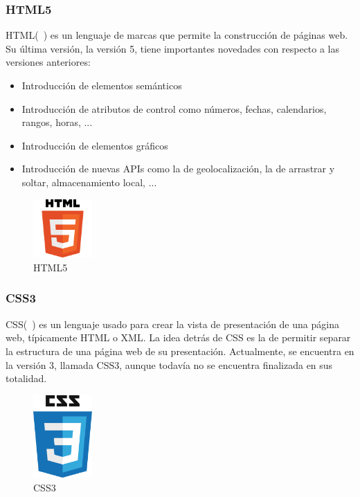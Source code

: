 \subsubsection*{HTML5}

HTML(~\cite{html5}) es un lenguaje de marcas que permite la construcción de páginas web. Su última versión, la versión 5, tiene importantes novedades con respecto a las versiones anteriores:

\begin{itemize}
\item Introducción de elementos semánticos
\item Introducción de atributos de control como números, fechas, calendarios, rangos, horas, ...
\item Introducción de elementos gráficos
\item Introducción de nuevas APIs como la de geolocalización, la de arrastrar y soltar, almacenamiento local, ...
\end{itemize}

\begin{figure}[tbh]
\centering
\label{fig:html5}
\includegraphics[width=0.2\textwidth]{imagenes/html5}
\caption{HTML5}
\end{figure}

\subsubsection*{CSS3}
CSS(~\cite{css3}) es un lenguaje usado para crear la vista de presentación de una página web, típicamente HTML o XML. La idea detrás de CSS es la de permitir separar la estructura de una página web de su presentación. Actualmente, se encuentra en la versión 3, llamada CSS3, aunque todavía no se encuentra finalizada en sus totalidad.

\begin{figure}[tbh]
\centering
\label{fig:css3}
\includegraphics[width=0.2\textwidth]{imagenes/css3}
\caption{CSS3}
\end{figure}

